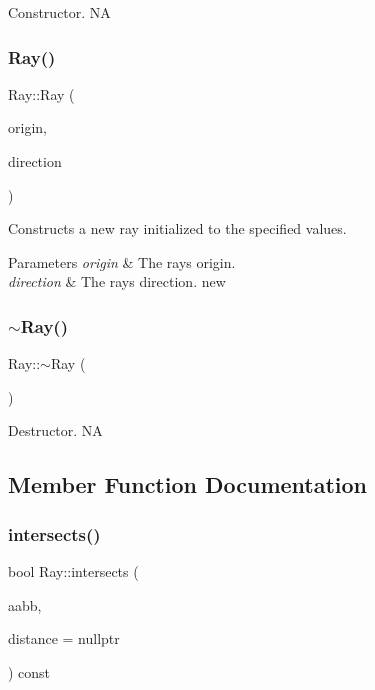 Constructor.  NA \mbox{\label{classRay_a9753a2cb8797a9c4d96883d79085d4ee}} 
\subsubsection{\texorpdfstring{Ray()}{Ray()}\hspace{0.1cm}{\footnotesize\ttfamily [6/6]}}
{\footnotesize\ttfamily Ray\+::\+Ray (\begin{DoxyParamCaption}\item[{const \hyperlink{classVec3}{Vec3} \&}]{origin,  }\item[{const \hyperlink{classVec3}{Vec3} \&}]{direction }\end{DoxyParamCaption})}

Constructs a new ray initialized to the specified values.


\begin{DoxyParams}{Parameters}
{\em origin} & The ray\textquotesingle{}s origin. \\
\hline
{\em direction} & The ray\textquotesingle{}s direction.  new \\
\hline
\end{DoxyParams}
\mbox{\label{classRay_a8b0e575ce5df046c0c7615c32a96a46f}} 
\subsubsection{\texorpdfstring{$\sim$\+Ray()}{~Ray()}\hspace{0.1cm}{\footnotesize\ttfamily [2/2]}}
{\footnotesize\ttfamily Ray\+::$\sim$\+Ray (\begin{DoxyParamCaption}{ }\end{DoxyParamCaption})}

Destructor.  NA 

\subsection{Member Function Documentation}
\mbox{\label{classRay_a2db2a0a4c6b8f67500d5b8b6542f5d50}} 
\subsubsection{\texorpdfstring{intersects()}{intersects()}\hspace{0.1cm}{\footnotesize\ttfamily [1/4]}}
{\footnotesize\ttfamily bool Ray\+::intersects (\begin{DoxyParamCaption}\item[{const \hyperlink{classAABB}{A\+A\+BB} \&}]{aabb,  }\item[{float $\ast$}]{distance = {\ttfamily nullptr} }\end{DoxyParamCaption}) const}

